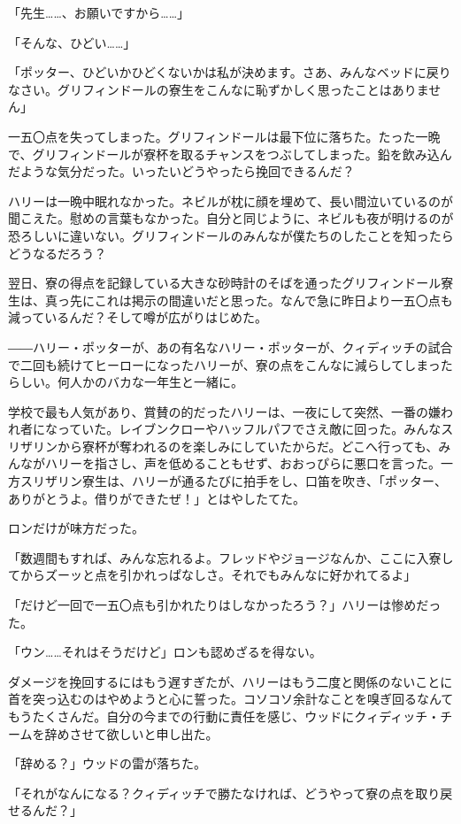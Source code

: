 \documentclass[10pt,a4paper]{article}
\begin{document}
\begin{CJK}{UTF8}{min}
「先生……、お願いですから……」

「そんな、ひどい……」

「ポッター、ひどいかひどくないかは私が決めます。さあ、みんなベッドに戻りなさい。グリフィンドールの寮生をこんなに恥ずかしく思ったことはありません」

一五〇点を失ってしまった。グリフィンドールは最下位に落ちた。たった一晩で、グリフィンドールが寮杯を取るチャンスをつぶしてしまった。鉛を飲み込んだような気分だった。いったいどうやったら挽回できるんだ？

ハリーは一晩中眠れなかった。ネビルが枕に顔を埋めて、長い間泣いているのが聞こえた。慰めの言葉もなかった。自分と同じように、ネビルも夜が明けるのが恐ろしいに違いない。グリフィンドールのみんなが僕たちのしたことを知ったらどうなるだろう？

翌日、寮の得点を記録している大きな砂時計のそばを通ったグリフィンドール寮生は、真っ先にこれは掲示の間違いだと思った。なんで急に昨日より一五〇点も減っているんだ？そして噂が広がりはじめた。

――ハリー・ポッターが、あの有名なハリー・ポッターが、クィディッチの試合で二回も続けてヒーローになったハリーが、寮の点をこんなに減らしてしまったらしい。何人かのバカな一年生と一緒に。

学校で最も人気があり、賞賛の的だったハリーは、一夜にして突然、一番の嫌われ者になっていた。レイブンクローやハッフルパフでさえ敵に回った。みんなスリザリンから寮杯が奪われるのを楽しみにしていたからだ。どこへ行っても、みんながハリーを指さし、声を低めることもせず、おおっぴらに悪口を言った。一方スリザリン寮生は、ハリーが通るたびに拍手をし、口笛を吹き、「ポッター、ありがとうよ。借りができたぜ！」とはやしたてた。

ロンだけが味方だった。

「数週間もすれば、みんな忘れるよ。フレッドやジョージなんか、ここに入寮してからズーッと点を引かれっぱなしさ。それでもみんなに好かれてるよ」

「だけど一回で一五〇点も引かれたりはしなかったろう？」ハリーは惨めだった。

「ウン……それはそうだけど」ロンも認めざるを得ない。

ダメージを挽回するにはもう遅すぎたが、ハリーはもう二度と関係のないことに首を突っ込むのはやめようと心に誓った。コソコソ余計なことを嗅ぎ回るなんてもうたくさんだ。自分の今までの行動に責任を感じ、ウッドにクィディッチ・チームを辞めさせて欲しいと申し出た。

「辞める？」ウッドの雷が落ちた。

「それがなんになる？クィディッチで勝たなければ、どうやって寮の点を取り戻せるんだ？」


\end{CJK}
\end{document}
